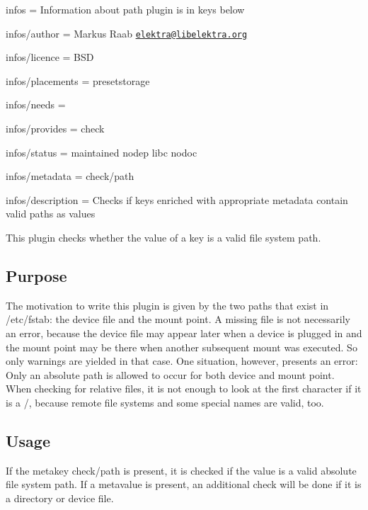 
\begin{DoxyItemize}
\item infos = Information about path plugin is in keys below
\item infos/author = Markus Raab \href{mailto:elektra@libelektra.org}{\tt elektra@libelektra.\+org}
\item infos/licence = B\+SD
\item infos/placements = presetstorage
\item infos/needs =
\item infos/provides = check
\item infos/status = maintained nodep libc nodoc
\item infos/metadata = check/path
\item infos/description = Checks if keys enriched with appropriate metadata contain valid paths as values
\end{DoxyItemize}

This plugin checks whether the value of a key is a valid file system path.

\subsection*{Purpose}

The motivation to write this plugin is given by the two paths that exist in /etc/fstab\+: the device file and the mount point. A missing file is not necessarily an error, because the device file may appear later when a device is plugged in and the mount point may be there when another subsequent mount was executed. So only warnings are yielded in that case. One situation, however, presents an error\+: Only an absolute path is allowed to occur for both device and mount point. When checking for relative files, it is not enough to look at the first character if it is a {\ttfamily /}, because remote file systems and some special names are valid, too.

\subsection*{Usage}

If the metakey {\ttfamily check/path} is present, it is checked if the value is a valid absolute file system path. If a metavalue is present, an additional check will be done if it is a directory or device file. 